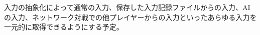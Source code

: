 
\begin{DoxyRefList}
\item[\label{todo__todo000001}%
\hypertarget{todo__todo000001}{}%
ファイル \hyperlink{_input_manager_8h}{Input\+Manager.h} ]入力の抽象化によって通常の入力、保存した入力記録ファイルからの入力、\+A\+Iの入力、ネットワーク対戦での他プレイヤーからの入力といったあらゆる入力を 一元的に取得できるようにする予定。 
\end{DoxyRefList}